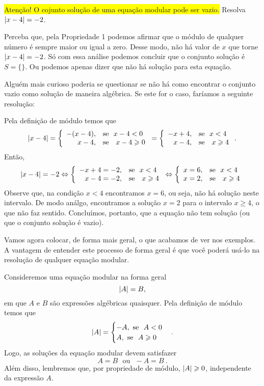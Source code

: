 \begin{exem}
 \colorbox{yellow}{Atenção! O cojunto solução de uma equação modular pode ser vazio.} Resolva $\left|x-4\right|=-2$.

Perceba que, pela Propriedade 1 podemos afirmar que o módulo de qualquer número é sempre maior ou igual a zero. Desse modo, não há valor de $x$ que torne $\left|x-4\right| = -2$. Só com essa análise podemos concluir que o conjunto solução é $S = \{  \}$. Ou podemos apenas dizer que não há solução para esta equação.

Alguém mais curioso poderia se questionar se não há como encontrar o conjunto vazio como solução de maneira algébrica. Se este for o caso, faríamos a seguinte resolução:

Pela definição de módulo temos que
     \[
    \left|x-4\right| = \left\{\begin{array}{rl}
    -(x-4), & \text{se} \ \ x-4 < 0 \\
    x-4, & \text{se } \ \ x-4 \geqslant 0
     \end{array}\right.
     =
    \left\{\begin{array}{rl}
    -x+4, & \text{se} \ \ x < 4 \\
    x-4, & \text{se } \ \ x \geqslant 4
     \end{array}\right..
     \]
     Então, 
     \[
     \left|x-4\right| = -2 \Leftrightarrow \left\{\begin{array}{rl}
    -x+4=-2, & \text{se} \ \ x < 4 \\
    x-4 = -2, & \text{se } \ \ x \geqslant 4
     \end{array}\right.
     \Leftrightarrow \left\{\begin{array}{rl}
     x = 6, & \text{se} \ \ x < 4 \\
    x = 2, & \text{se } \ \ x \geqslant 4
     \end{array}\right.
     \]
 Observe que, na condição $x<4$ encontramos $x = 6$, ou seja, não há solução neste intervalo. De modo análgo, encontramos a solução $x = 2$ para o intervalo $x \geq 4$, o que não faz sentido. Concluímos, portanto, que a equação não tem solução (ou que o conjunto solução é vazio).
\end{exem}

 Vamos agora colocar, de forma mais geral, o que acabamos de ver nos exemplos. A vantagem de entender este processo de forma geral é que você poderá usá-lo na resolução de qualquer equação modular. 
 
 Consideremos uma equação modular na forma geral
\begin{equation*}
\left|A\right|= B,
\end{equation*}
 em que $A$ e $B$ são expressões algébricas quaisquer. Pela definição de módulo temos que
 \[ \left|A\right|= \begin{cases}
          -A, \ \text{se} \ \ A < 0 \\
           A, \ \text{se} \ \ A \geqslant 0
         \end{cases}.
 \]
 Logo, as soluções da equação modular devem satisfazer
\begin{equation*}
A= B \ \ \ \text{ou} \ \ \ -A= B \ .
\end{equation*}
 Além disso, lembremos que, por propriedade de módulo, $\left|A\right|\geqslant 0$, independente da expressão $A$.
 
